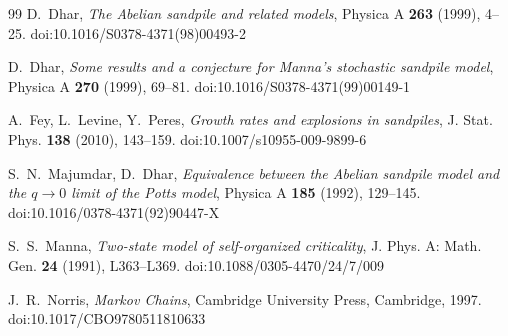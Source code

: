 \documentclass[11pt]{amsart}
\theoremstyle{definition}
\begin{document}
\begin{thebibliography}{99}
 D.~Dhar, \emph{The Abelian sandpile and related models}, Physica A \textbf{263} (1999), 4--25. doi:10.1016/S0378-4371(98)00493-2

 D.~Dhar, \emph{Some results and a conjecture for Manna's stochastic sandpile model}, Physica A \textbf{270} (1999), 69--81. doi:10.1016/S0378-4371(99)00149-1

 A.~Fey, L.~Levine, Y.~Peres, \emph{Growth rates and explosions in sandpiles}, J. Stat. Phys. \textbf{138} (2010), 143--159. doi:10.1007/s10955-009-9899-6

 S.~N.~Majumdar, D.~Dhar, \emph{Equivalence between the Abelian sandpile model and the $q\to0$ limit of the Potts model}, Physica A \textbf{185} (1992), 129--145. doi:10.1016/0378-4371(92)90447-X

 S.~S.~Manna, \emph{Two-state model of self-organized criticality}, J. Phys. A: Math. Gen. \textbf{24} (1991), L363--L369. doi:10.1088/0305-4470/24/7/009

 J.~R.~Norris, \emph{Markov Chains}, Cambridge University Press, Cambridge, 1997. doi:10.1017/CBO9780511810633

\end{thebibliography}
\end{document}
